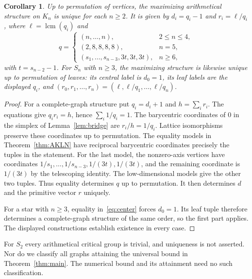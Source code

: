\documentclass[11pt]{article}
\newtheorem{corollary}[theorem]{Corollary}
\theoremstyle{remark}
\DeclareMathOperator{\lcm}{lcm}
\begin{document}
\begin{corollary}\label{cor:equality}
Up to permutation of vertices, the maximizing arithmetical structure on $K_n$ is unique for each $n\geq2$. It is given by $d_i=q_i-1$ and $r_i=\ell/q_i$, where $\ell=\lcm(q_i)$ and
\[
 q=\begin{cases}
 (n,\ldots,n),&2\leq n\leq4,\\
 (2,8,8,8,8),&n=5,\\
 (s_1,\ldots,s_{n-3},3t,3t,3t),&n\geq6,
 \end{cases}
\]
with $t=s_{n-2}-1$. For $S_n$ with $n\geq3$, the maximizing structure is likewise unique up to permutation of leaves: its central label is $d_0=1$, its leaf labels are the displayed $q_i$, and $(r_0,r_1,\ldots,r_n)=(\ell,\ell/q_1,\ldots,\ell/q_n)$.
\end{corollary}
\begin{proof}
For a complete-graph structure put $q_i=d_i+1$ and $h=\sum_i r_i$. The equations give $q_i r_i=h$, hence $\sum_i1/q_i=1$. The barycentric coordinates of $0$ in the simplex of Lemma~\ref{lem:bridge} are $r_i/h=1/q_i$. Lattice isomorphisms preserve these coordinates up to permutation. The equality models in Theorem~\ref{thm:AKLN} have reciprocal barycentric coordinates precisely the tuples in the statement. For the last model, the nonzero-axis vertices have coordinates $1/s_1,\ldots,1/s_{n-3},1/(3t),1/(3t)$, and the remaining coordinate is $1/(3t)$ by the telescoping identity. The low-dimensional models give the other two tuples. Thus equality determines $q$ up to permutation. It then determines $d$ and the primitive vector $r$ uniquely.

For a star with $n\geq3$, equality in~\eqref{eq:center} forces $d_0=1$. Its leaf tuple therefore determines a complete-graph structure of the same order, so the first part applies. The displayed constructions establish existence in every case.
\end{proof}

For $S_2$ every arithmetical critical group is trivial, and uniqueness is not asserted. Nor do we classify all graphs attaining the universal bound in Theorem~\ref{thm:main}. The numerical bound and its attainment need no such classification.
\end{document}
